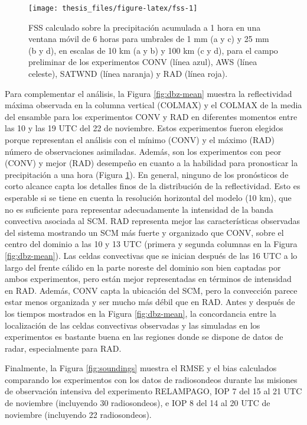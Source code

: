 \documentclass[12pt,oneside,a4paper]{reedthesis}
\begin{document}
\begin{figure}
\texttt{[image: thesis\_files/figure-latex/fss-1]} \caption{FSS calculado sobre la precipitación acumulada a 1 hora en una ventana móvil de 6 horas para umbrales de 1 mm (a y c) y 25 mm (b y d), en escalas de 10 km (a y b) y 100 km (c y d), para el campo preliminar de los experimentos CONV (línea azul), AWS (línea celeste), SATWND (línea naranja) y RAD (línea roja).}\label{fig:fss}
\end{figure}
Para complementar el análisis, la Figura \ref{fig:dbz-mean} muestra la reflectividad máxima observada en la columna vertical (COLMAX) y el COLMAX de la media del ensamble para los experimentos CONV y RAD en diferentes momentos entre las 10 y las 19 UTC del 22 de noviembre. Estos experimentos fueron elegidos porque representan el análisis con el mínimo (CONV) y el máximo (RAD) número de observaciones asimiladas. Además, son los experimentos con peor (CONV) y mejor (RAD) desempeño en cuanto a la habilidad para pronosticar la precipitación a una hora (Figura \ref{fig:fss}). En general, ninguno de los pronósticos de corto alcance capta los detalles finos de la distribución de la reflectividad. Esto es esperable si se tiene en cuenta la resolución horizontal del modelo (10 km), que no es suficiente para representar adecuadamente la intensidad de la banda convectiva asociada al SCM. RAD representa mejor las características observadas del sistema mostrando un SCM más fuerte y organizado que CONV, sobre el centro del dominio a las 10 y 13 UTC (primera y segunda columnas en la Figura \ref{fig:dbz-mean}). Las celdas convectivas que se inician después de las 16 UTC a lo largo del frente cálido en la parte noreste del dominio son bien captadas por ambos experimentos, pero están mejor representadas en términos de intensidad en RAD. Además, CONV capta la ubicación del SCM, pero la convección parece estar menos organizada y ser mucho más débil que en RAD. Antes y después de los tiempos mostrados en la Figura \ref{fig:dbz-mean}, la concordancia entre la localización de las celdas convectivas observadas y las simuladas en los experimentos es bastante buena en las regiones donde se dispone de datos de radar, especialmente para RAD.

Finalmente, la Figura \ref{fig:soundings} muestra el RMSE y el bias calculados comparando los experimentos con los datos de radiosondeos durante las misiones de observación intensiva del experimento RELAMPAGO, IOP 7 del 15 al 21 UTC de noviembre (incluyendo 30 radiosondeos), e IOP 8 del 14 al 20 UTC de noviembre (incluyendo 22 radiosondeos).
\end{document}
